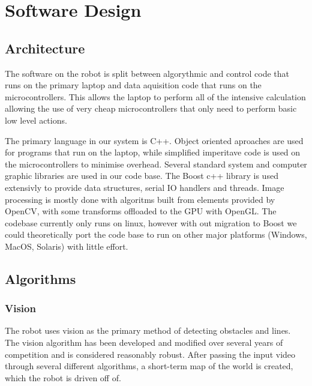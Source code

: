 \section{Software Design}

\subsection{Architecture}

The software on the robot is split between algorythmic and control code that runs on the primary laptop and data aquisition code that runs on the microcontrollers. This allows the laptop to perform all of the intensive calculation allowing the use of very cheap microcontrollers that only need to perform basic low level actions.

The primary language in our system is C++. Object oriented aproaches are used for programs that run on the laptop, while simplified imperitave code is used on the microcontrollers to minimise overhead. Several standard system and computer graphic libraries are used in our code base. The Boost c++ library is used extensivly to provide data structures, serial IO handlers and threads. Image processing is mostly done with algoritms built from elements provided by OpenCV, with some transforms offloaded to the GPU with OpenGL. The codebase currently only runs on linux, however with out migration to Boost we could theoretically port the code base to run on other major platforms (Windows, MacOS, Solaris) with little effort.

\subsection{Algorithms}

\subsubsection{Vision}

The robot uses vision as the primary method of detecting obstacles and lines. The vision algorithm has been developed and modified over several years of competition and is considered reasonably robust. After passing the input video through several different algorithms, a short-term map of the world is created, which the robot is driven off of.

